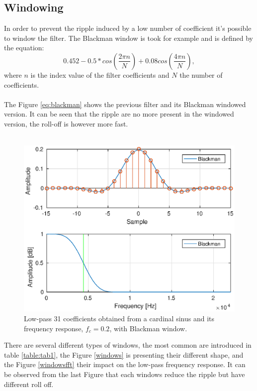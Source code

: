 \documentclass[twoside,twocolumn]{article}
\begin{document}
\subsection{Windowing}
In order to prevent the ripple induced by a low number of coefficient it's possible to window the filter. The Blackman window is took for example and is defined by the equation:
\begin{equation}
 0.452 - 0.5*cos(\frac{2\pi n}{N}) + 0.08cos(\frac{4\pi n}{N}),
\label{eq:blackman}
\end{equation}
where $n$ is the index value of the filter coefficients and $N$ the number of coefficients.\\ \\
The Figure \ref{eq:blackman} shows the previous filter and its Blackman windowed version. It can be seen that the ripple are no more present in the windowed version, the roll-off is however more fast.\\ \\
\begin{figure}[h!]
	\centering
	\includegraphics[scale=0.45]{./images/lp_31pts_fc02_blackman.eps}
	\caption{Low-pass 31 coefficients obtained from a	 cardinal sinus and its frequency response, $f_c=0.2$, with Blackman window.}
	\label{blackman}
\end{figure}
 There are several different types of windows, the most common are introduced in table \ref{table:tab1}, the Figure \ref{windows} is presenting their different shape, and the Figure  \ref{windowsfft} their impact on the low-pass frequency response. It can be observed from the last Figure that each windows reduce the ripple but have different roll off.
 
\end{document}
